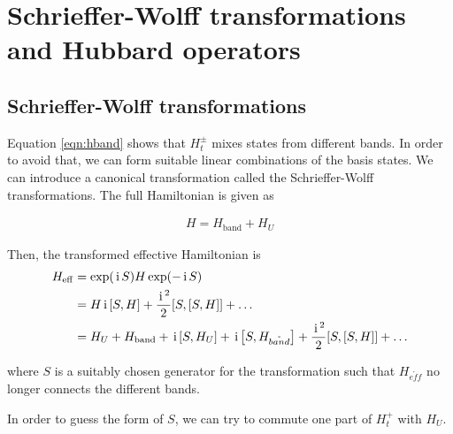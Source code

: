 \documentclass[]{report}
\newcommand{\I}{\,\mathrm{i}\,}
\begin{document}
\chapter{Schrieffer-Wolff transformations and Hubbard operators}
\section{Schrieffer-Wolff transformations}
Equation \eqref{eqn:hband} shows that $ H^{\pm}_{t} $ mixes states from different bands. In order to avoid that, we can form suitable linear combinations of the basis states. We can introduce a canonical transformation called the Schrieffer-Wolff transformations. The full Hamiltonian is given as

\begin{align}
H = H_{\mathrm{band}} + H_U
\end{align}

Then, the transformed effective Hamiltonian is
\begin{align}
\nonumber
H_{\mathrm{eff}} &= \exp(\I S) H \exp(-\I S)\\
\nonumber
&= H \I \comm{S}{H} + \frac{\I^2}{2} \comm{S}{\comm{S}{H}} + \dots\\
&= H_U + H_{\mathrm{band}} + \I \comm{S}{H_U} + \I \comm{S}{H_{\mathring{band}}} + \frac{\I^2}{2} \comm{S}{\comm{S}{H}} + \dots
\end{align}

where $ S $ is a suitably chosen generator for the transformation such that $ H_{\mathring{eff}} $ no longer connects the different bands.

In order to guess the form of $ S $, we can try to commute one part of $ H^{+}_{t} $ with $ H_U $.
\end{document}
